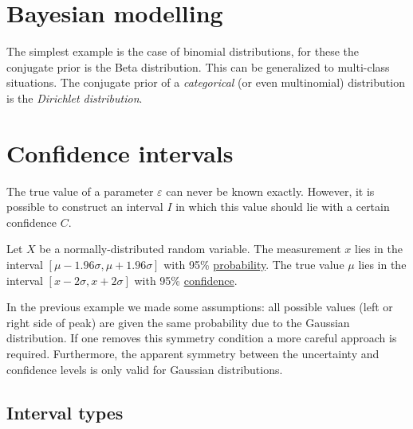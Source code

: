 {\section{Bayesian modelling}


    \begin{example}
        The simplest example is the case of binomial distributions, for these the conjugate prior is the Beta distribution. This can be generalized to multi-class situations. The conjugate prior of a \textit{categorical} (or even multinomial) distribution is the \textit{Dirichlet distribution}.
    \end{example}

\section{Confidence intervals}

    The true value of a parameter $\varepsilon$ can never be known exactly. However, it is possible to construct an interval $I$ in which this value should lie with a certain confidence $C$.
    \begin{example}
        Let $X$ be a normally-distributed random variable. The measurement $x$ lies in the interval $[\mu - 1.96\sigma, \mu+1.96\sigma]$ with 95\% \underline{probability}. The true value $\mu$ lies in the interval $[x - 2\sigma, x+2\sigma]$ with 95\% \underline{confidence}.
    \end{example}
    \begin{remark*}
        In the previous example we made some assumptions: all possible values (left or right side of peak) are given the same probability due to the Gaussian distribution. If one removes this symmetry condition a more careful approach is required. Furthermore, the apparent symmetry between the uncertainty and confidence levels is only valid for Gaussian distributions.
    \end{remark*}

\subsection{Interval types}

}
